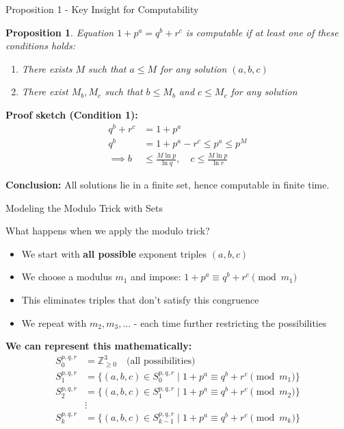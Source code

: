 ﻿\documentclass[10pt,aspectratio=169]{beamer}
\newtheorem{proposition}{Proposition}
\begin{document}
\begin{frame}{Proposition 1 - Key Insight for Computability}
    \begin{proposition}
       Equation $1+p^a = q^b + r^c$ is computable if at least one of these conditions holds:
       \begin{enumerate}
           \item There exists $M$ such that $a \leq M$ for any solution $(a,b,c)$
           \item There exist $M_b, M_c$ such that $b \leq M_b$ and $c \leq M_c$ for any solution
       \end{enumerate}
    \end{proposition}
    
    \textbf{Proof sketch (Condition 1):}
    \begin{align*}
        q^b+r^c &= 1+p^a \\
        q^b &= 1+p^a - r^c \leq p^a \leq p^M \\
        \implies b &\leq \frac{M\ln p}{\ln q},\quad c \leq \frac{M\ln p}{\ln r}
    \end{align*}
    
    \textbf{Conclusion:} All solutions lie in a finite set, hence computable in finite time.
\end{frame}
\begin{frame}{Modeling the Modulo Trick with Sets}
    \begin{block}{What happens when we apply the modulo trick?}
        \begin{itemize}
            \item We start with \textbf{all possible} exponent triples $(a,b,c)$
            \item We choose a modulus $m_1$ and impose: $1+p^a \equiv q^b+r^c \pmod{m_1}$
            \item This eliminates triples that don't satisfy this congruence
            \item We repeat with $m_2, m_3, ...$ - each time further restricting the possibilities
        \end{itemize}
    \end{block}
    
    \vspace{0.3cm}
    \textbf{We can represent this mathematically:}
    \begin{align*}
        S_0^{p,q,r} &= \mathbb{Z}_{\geq 0}^3 \quad \text{(all possibilities)} \\
        S_1^{p,q,r} &= \{(a,b,c) \in S_0^{p,q,r} \; | \; 1+p^a \equiv q^b+r^c \pmod{m_1}\} \\
        S_2^{p,q,r} &= \{(a,b,c) \in S_1^{p,q,r} \; | \; 1+p^a \equiv q^b+r^c \pmod{m_2}\} \\
        &\vdots \\
        S_k^{p,q,r} &= \{(a,b,c) \in S_{k-1}^{p,q,r} \; | \; 1+p^a \equiv q^b+r^c \pmod{m_k}\}
    \end{align*}
\end{frame}
\end{document}
